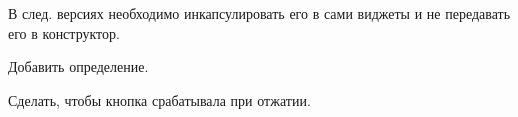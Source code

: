 
\begin{DoxyRefList}
\item[Class \mbox{\hyperlink{class_l_graphics_1_1_l_base_component}{L\+Graphics\+::L\+Base\+Component}} ]\label{todo__todo000001}%
%
В след. версиях необходимо инкапсулировать его в сами виджеты и не передавать его в конструктор.  
\item[Member \mbox{\hyperlink{class_l_graphics_1_1_l_error_a598e5af71074c5070941a213213423cb}{L\+Graphics\+::L\+Error\+::print\+To\+Display}} (const std\+::string \&error)]\label{todo__todo000002}%
%
Добавить определение.  
\item[Class \mbox{\hyperlink{class_l_graphics_1_1_l_i_button}{L\+Graphics\+::L\+I\+Button}} ]\label{todo__todo000003}%
%
Сделать, чтобы кнопка срабатывала при отжатии. 
\end{DoxyRefList}